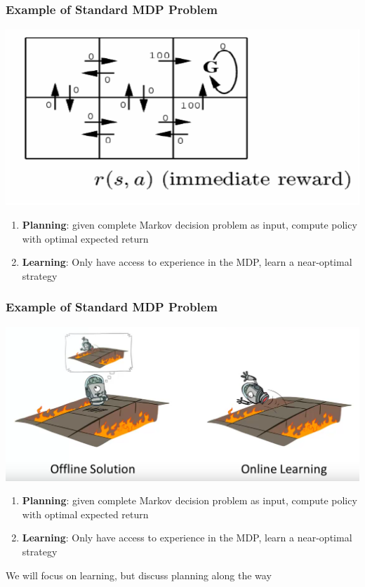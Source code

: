 \documentclass{beamer}
\renewcommand{\high}{\textbf}
\begin{document}
\begin{frame}\frametitle{Example of Standard MDP Problem}\small
\begin{center}
\includegraphics[width=0.54\linewidth]{Figures/tic_tac_rl} 
\end{center}
\begin{enumerate}
\item  \high{Planning}: given complete Markov decision problem as input, compute policy with optimal expected return
\item \high{Learning}: Only have access to experience in the MDP, learn a near-optimal strategy
\end{enumerate}
\end{frame}

\begin{frame}\frametitle{Example of Standard MDP Problem}\small
\begin{center}
\includegraphics[width=0.785\linewidth,trim=0 50 0 0,clip]{Figures/rll4} 
\end{center}
\begin{enumerate}
\item  \high{Planning}: given complete Markov decision problem as input, compute policy with optimal expected return
\item \high{Learning}: Only have access to experience in the MDP, learn a near-optimal strategy
\end{enumerate}
We will focus on learning, but discuss planning along the way
\end{frame}
\end{document}
